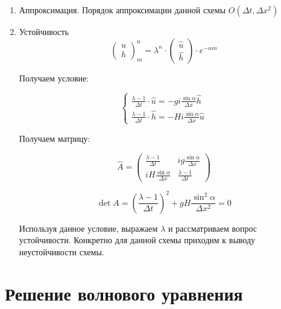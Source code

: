 \documentclass[10pt,a4paper]{article}
\begin{document}
	\begin{enumerate}
		\item Аппроксимация. Порядок аппроксимации данной схемы $O\left(
		\Delta t, \Delta x^{2}\right)$
		\item Устойчивость
		\begin{equation}
			\begin{pmatrix}
				u \\ h
			\end{pmatrix}^{n}_{m} = \lambda^{n}\cdot
			\begin{pmatrix}
				\hat{u} \\ \hat{h}
			\end{pmatrix}\cdot e^{-\alpha m}
		\end{equation}
		
		Получаем условие:
		
		\begin{equation}
			\begin{cases}
				\frac{\lambda - 1}{\Delta t}\cdot\hat{u} = -gi\frac{\sin\alpha}
				{\Delta x}\hat{h}
				\\
				\frac{\lambda - 1}{\Delta t}\cdot\hat{h} = -Hi\frac{\sin\alpha}
				{\Delta x}\hat{u}
			\end{cases}
		\end{equation}
		
		Получаем матрицу:
		
		\begin{equation}
			\hat{A} = \begin{pmatrix}
				\frac{\lambda - 1}{\Delta t} & ig\frac{\sin\alpha}{\Delta x}
				\\
				iH\frac{\sin\alpha}{\Delta x} & \frac{\lambda - 1}{\Delta t}
			\end{pmatrix}
		\end{equation}
		
		\begin{equation}
			\det A = \left(\frac{\lambda - 1}{\Delta t}\right)^{2} + gH
			\frac{\sin^{2}\alpha}{\Delta x^{2}} = 0
		\end{equation}
		
		Используя данное условие, выражаем $\lambda$ и рассматриваем вопрос 
		устойчивости. Конкретно для данной схемы приходим к выводу 
		неустойчивости схемы.
	\end{enumerate}
	
	\section{Решение волнового уравнения}
	
\end{document}
